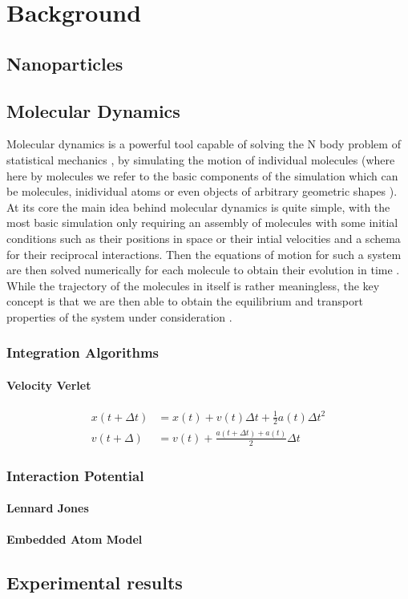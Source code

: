 \chapter{Background}
\lipsum[1]
\section{Nanoparticles}
\lipsum[1]

\section{Molecular Dynamics}
Molecular dynamics is a powerful tool capable of solving the N body problem of statistical mechanics \cite{Haile1997}, by simulating the motion of individual molecules (where here by molecules we refer to the basic components of the simulation which can be molecules, inidividual atoms or even objects of arbitrary geometric shapes \cite{Allen2017, LAMMPS}).
At its core the main idea behind molecular dynamics is quite simple, with the most basic simulation only requiring an assembly of molecules with some initial conditions such as their positions in space or their intial velocities and a schema for their reciprocal interactions. Then the equations of motion for such a system are then solved numerically for each molecule to obtain their evolution in time \cite{Haile1997}. While the trajectory of the molecules in itself is rather meaningless, the key concept is that we are then able to obtain the equilibrium and transport properties of the system under consideration \cite{Frenkel1996}.\newline

\subsection{Integration Algorithms}

\subsubsection{Velocity Verlet}
\begin{subequations}
\label{eq:velverlet}
\begin{align}
x(t+\Delta t) &= x(t) + v(t)  \Delta t  + \frac{1}{2} a(t)\Delta t^2\label{eq:posverlet}\\
v(t + \Delta) &= v(t) + \frac{a(t+\Delta t) + a(t)}{2}\Delta t \label{eq:veloverlet}
\end{align}
\end{subequations}
\subsection{Interaction Potential}
\subsubsection{Lennard Jones}
\subsubsection{Embedded Atom Model}
\section{Experimental results}